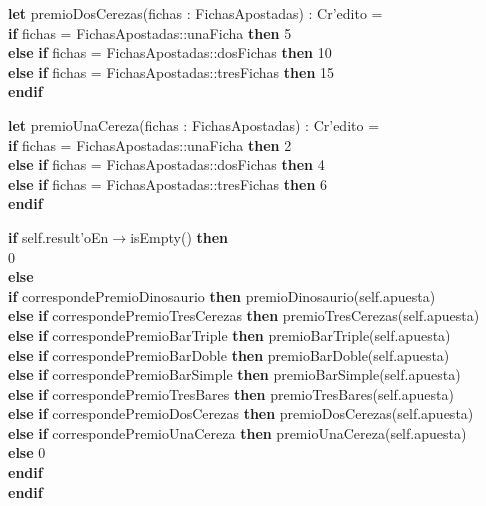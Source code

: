 \begin{itemize}
    \textbf{let} premioDosCerezas(fichas : FichasApostadas) : Cr'edito =\\
        \textbf{if} fichas = FichasApostadas::unaFicha \textbf{then} 5\\
        \textbf{else} \textbf{if} fichas = FichasApostadas::dosFichas \textbf{then} 10\\
        \textbf{else} \textbf{if} fichas = FichasApostadas::tresFichas \textbf{then} 15\\
        \textbf{endif}

    \textbf{let} premioUnaCereza(fichas : FichasApostadas) : Cr'edito =\\
        \textbf{if} fichas = FichasApostadas::unaFicha \textbf{then} 2\\
        \textbf{else} \textbf{if} fichas = FichasApostadas::dosFichas \textbf{then} 4\\
        \textbf{else} \textbf{if} fichas = FichasApostadas::tresFichas \textbf{then} 6\\
        \textbf{endif}

    \textbf{if} self.result'oEn$\rightarrow$isEmpty() \textbf{then}\\
        0\\
    \textbf{else}\\
        \textbf{if} correspondePremioDinosaurio \textbf{then} premioDinosaurio(self.apuesta)\\
        \textbf{else} \textbf{if} correspondePremioTresCerezas \textbf{then} premioTresCerezas(self.apuesta)\\
        \textbf{else} \textbf{if} correspondePremioBarTriple \textbf{then} premioBarTriple(self.apuesta)\\
        \textbf{else} \textbf{if} correspondePremioBarDoble \textbf{then} premioBarDoble(self.apuesta)\\
        \textbf{else} \textbf{if} correspondePremioBarSimple \textbf{then} premioBarSimple(self.apuesta)\\
        \textbf{else} \textbf{if} correspondePremioTresBares \textbf{then} premioTresBares(self.apuesta)\\
        \textbf{else} \textbf{if} correspondePremioDosCerezas \textbf{then} premioDosCerezas(self.apuesta)\\
        \textbf{else} \textbf{if} correspondePremioUnaCereza \textbf{then} premioUnaCereza(self.apuesta)\\
        \textbf{else} 0\\
        \textbf{endif}\\
    \textbf{endif}


\end{itemize}
